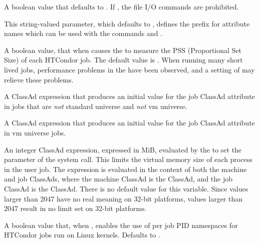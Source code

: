 \begin{description}
\label{param:EnableChirpIO}
\item[\Macro{ENABLE\_CHIRP\_IO}]
  A boolean value that defaults to .  If ,
  the file I/O  commands are prohibited.

\label{param:RemoteUpdatePrefix}
\item[\Macro{REMOTE\_UPDATE\_PREFIX}]
  This string-valued parameter, which defaults to ,
  defines the prefix for attribute names which can be used with the
   commands  and 
  .

\label{param:UsePSS} 
\item[\Macro{USE\_PSS}]
  A boolean value, that when  causes the  to
  measure the PSS (Proportional Set Size) of each HTCondor job.
  The default value is .
  When running many short lived jobs, performance problems in 
  the  have been observed, and a setting of 
  may relieve these problems.

\label{param:MemoryUsageMetric} 
\item[\Macro{MEMORY\_USAGE\_METRIC}]
  A ClassAd expression that produces an initial value for the job ClassAd
  attribute  in jobs that are \emph{not} standard 
  universe and \emph{not} vm universe.

\label{param:MemoryUsageMetricVM} 
\item[\Macro{MEMORY\_USAGE\_METRIC\_VM}]
  A ClassAd expression that produces an initial value for the job ClassAd
  attribute  in vm universe jobs.

\label{param:StarterRlimitAs} 
\item[ \Macro{STARTER\_RLIMIT\_AS}]
  An integer ClassAd expression, 
  expressed in MiB,
  evaluated by the  to set the  parameter
  of the  system call.
  This limits the virtual memory size of each process in the user job.  
  The expression is
  evaluated in the context of both the machine and job ClassAds,
  where the machine ClassAd is the  ClassAd,
  and the job ClassAd is the  ClassAd.
  There is no default value for this variable.
  Since values larger than 2047 have no real meaning on 32-bit platforms,
  values larger than 2047 result in no limit set on 32-bit platforms.

\label{param:UsePidNamespaces} 
\item[ \Macro{USE\_PID\_NAMESPACES}]
  A boolean value that, when , enables the use of per job PID
  namespaces for HTCondor jobs run on Linux kernels.
  Defaults to .


\end{description}
